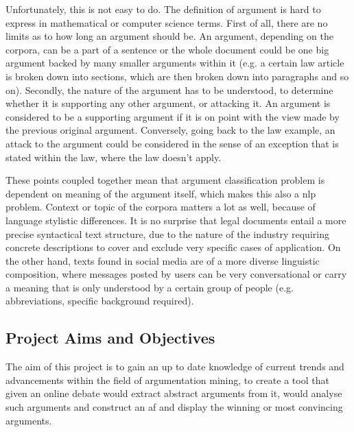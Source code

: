      Unfortunately, this is not easy to do. The definition of argument is hard to express in mathematical or computer science terms. First of all, there are no limits as to how long an argument should be. An argument, depending on the corpora, can be a part of a sentence or the whole document could be one big argument backed by many smaller arguments within it (e.g. a certain law article is broken down into sections, which are then broken down into paragraphs and so on). Secondly, the nature of the argument has to be understood, to determine whether it is supporting any other argument, or attacking it. An argument is considered to be a supporting argument if it is on point with the view made by the previous original argument. Conversely, going back to the law example, an attack to the argument could be considered in the sense of an exception that is stated within the law, where the law doesn't apply. 
     
     These points coupled together mean that argument classification problem is dependent on meaning of the argument itself, which makes this also a \gls{nlp} problem. Context or topic of the corpora matters a lot as well, because of language stylistic differences. It is no surprise that legal documents entail a more precise syntactical text structure, due to the nature of the industry requiring concrete descriptions to cover and exclude very specific cases of application. On the other hand, texts found in social media are of a more diverse linguistic composition, where messages posted by users can be very conversational or carry a meaning that is only understood by a certain group of people (e.g. abbreviations, specific background required).
    
    \subsection{Project Aims and Objectives} 
     The aim of this project is to gain an up to date knowledge of current trends and advancements within the field of argumentation mining, to create a tool that given an online debate would extract abstract arguments from it, would analyse such arguments and construct an \gls{af} and display the winning or most convincing arguments.
    